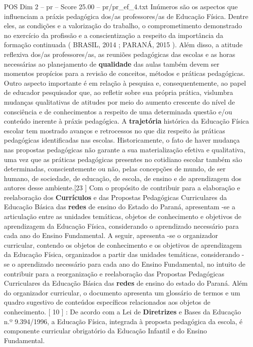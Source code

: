 \begin{textsample}{POS Dim 2 – pr – Score 25.00 – pr/pr\_ef\_4.txt}
Inúmeros são os aspectos que influenciam a práxis pedagógica dos/as professores/as de Educação Física.
Dentre eles, as condições e a valorização do trabalho, o comprometimento demonstrado no exercício da profissão e a conscientização a respeito da importância da formação continuada ( BRASIL, 2014 ; PARANÁ, 2015 ).
Além disso, a atitude reflexiva dos/as professores/as, as reuniões pedagógicas das escolas e as horas necessárias ao planejamento de \textbf{qualidade} das aulas também devem ser momentos propícios para a revisão de conceitos, métodos e práticas pedagógicas.
Outro aspecto importante é em relação à pesquisa e, consequentemente, ao papel de educador pesquisador que, ao refletir sobre sua própria prática, vislumbra mudanças qualitativas de atitudes por meio do aumento crescente do nível de consciência e de conhecimentos a respeito de uma determinada questão e/ou conteúdo inerente à práxis pedagógica.
A \textbf{trajetória} histórica da Educação Física escolar tem mostrado avanços e retrocessos no que diz respeito às práticas pedagógicas identificadas nas escolas.
Historicamente, o fato de haver mudança nas propostas pedagógicas não garante a sua materialização efetiva e qualitativa, uma vez que as práticas pedagógicas presentes no cotidiano escolar também são determinadas, conscientemente ou não, pelas concepções de mundo, de ser humano, de sociedade, de educação, de escola, de ensino e de aprendizagem dos autores desse ambiente.[23 ] Com o propósito de contribuir para a elaboração e reelaboração dos \textbf{Currículos} e das Propostas Pedagógicas Curriculares da Educação Básica das \textbf{redes} de ensino do Estado do Paraná, apresentam -se a articulação entre as unidades temáticas, objetos de conhecimento e objetivos de aprendizagem da Educação Física, considerando o aprendizado necessário para cada ano do Ensino Fundamental.
A seguir, apresenta -se o organizador curricular, contendo os objetos de conhecimento e os objetivos de aprendizagem da Educação Física, organizados a partir das unidades temáticas, considerando -se o aprendizado necessário para cada ano do Ensino Fundamental, no intuito de contribuir para a reorganização e reelaboração das Propostas Pedagógicas Curriculares da Educação Básica das \textbf{redes} de ensino do estado do Paraná.
Além do organizador curricular, o documento apresenta um glossário de termos e um quadro sugestivo de conteúdos específicos relacionados aos objetos de conhecimento. [ 10 ] : De acordo com a Lei de \textbf{Diretrizes} e Bases da Educação n.º 9.394/1996, a Educação Física, integrada à proposta pedagógica da escola, é componente curricular obrigatório da Educação Infantil e do Ensino Fundamental.

\end{textsample}
